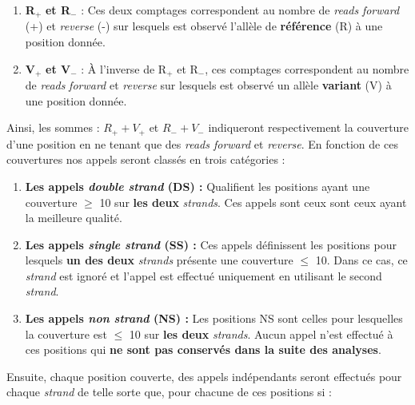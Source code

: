 \documentclass[12pt,twoside]{ugathesis}
\providecommand{\tightlist}{%
  \setlength{\itemsep}{0pt}\setlength{\parskip}{0pt}}
\begin{document}
\begin{enumerate}
\def\labelenumi{\arabic{enumi}.}
\tightlist
\item
  \textbf{R}\(_+\) \textbf{et R}\(_-\) : Ces deux comptages
  correspondent au nombre de \emph{reads} \emph{forward} (+) et
  \emph{reverse} (-) sur lesquels est observé l'allèle de
  \textbf{référence} (R) à une position donnée.\\
\item
  \textbf{V}\(_+\) \textbf{et V}\(_-\) : À l'inverse de R\(_+\) et
  R\(_-\), ces comptages correspondent au nombre de \emph{reads}
  \emph{forward} et \emph{reverse} sur lesquels est observé un allèle
  \textbf{variant} (V) à une position donnée.
\end{enumerate}

Ainsi, les sommes : \(R_+ + V_+\) et \(R_- + V_-\) indiqueront
respectivement la couverture d'une position en ne tenant que des
\emph{reads forward} et \emph{reverse}. En fonction de ces couvertures
nos appels seront classés en trois catégories :

\begin{enumerate}
\def\labelenumi{\arabic{enumi}.}
\item
  \textbf{Les appels \emph{double strand} (DS) :} Qualifient les
  positions ayant une couverture \(\ge\) 10 sur \textbf{les deux}
  \emph{strands}. Ces appels sont ceux sont ceux ayant la meilleure
  qualité.
\item
  \textbf{Les appels \emph{single strand} (SS) :} Ces appels définissent
  les positions pour lesquels \textbf{un des deux} \emph{strands}
  présente une couverture \(\le\) 10. Dans ce cas, ce \emph{strand} est
  ignoré et l'appel est effectué uniquement en utilisant le second
  \emph{strand}.\\
\item
  \textbf{Les appels \emph{non strand} (NS) :} Les positions NS sont
  celles pour lesquelles la couverture est \(\le\) 10 sur \textbf{les
  deux} \emph{strands}. Aucun appel n'est effectué à ces positions qui
  \textbf{ne sont pas conservés dans la suite des analyses}.
\end{enumerate}

Ensuite, chaque position couverte, des appels indépendants seront
effectués pour chaque \emph{strand} de telle sorte que, pour chacune de
ces positions si :
\end{document}
